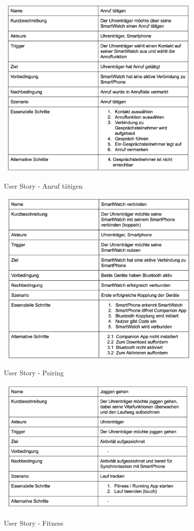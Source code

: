\begin{appendices}
\begin{figure}[H]
\centering\
\includegraphics[width=10cm]{img/story_out}
\caption{User Story - Anruf tätigen}\label{fig:story-out}
\end{figure}
\begin{figure}[H]
\centering\
\includegraphics[width=10cm]{img/story_pairing}
\caption{User Story - Pairing}\label{fig:story-pairing}
\end{figure}
\begin{figure}[H]
\centering\
\includegraphics[width=10cm]{img/story_joggen}
\caption{User Story - Fitness}\label{fig:story-joggen}
\end{figure}


\end{appendices}
